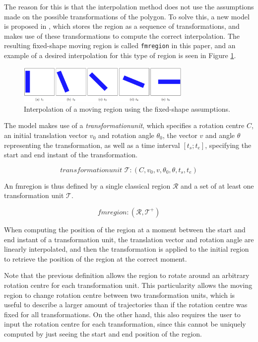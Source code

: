 The reason for this is that the interpolation method does not use the assumptions made on the possible transformations of the polygon. To solve this, a new model is proposed in \cite{fmregion}, which stores the region as a sequence of transformations, and makes use of these transformations to compute the correct interpolation. The resulting fixed-shape moving region is called \lstinline{fmregion} in this paper, and an example of a desired interpolation for this type of region is seen in Figure \ref{fig:fixed_shape_interpolation}.

\begin{figure}[h!]
    \centering
    \includegraphics[width=0.75\textwidth]{images/fixed_shape_interpolation.png}
    \caption[Linear interpolation of a fixed-shape moving region]{Interpolation of a moving region using the fixed-shape assumptions. \cite{fmregion}}
    \label{fig:fixed_shape_interpolation}
\end{figure}


The model makes use of a \textit{transformationunit}, which specifies a rotation centre $C$, an initial translation vector $v_0$ and rotation angle $\theta_0$, the vector $v$ and angle $\theta$ representing the transformation, as well as a time interval $[t_s; t_e]$, specifying the start and end instant of the transformation.

\[
    \textit{transformationunit } \mathcal{T}: (C, v_0, v, \theta_0, \theta, t_{s}, t_{e})
\]

An fmregion is thus defined by a single classical region $\mathcal{R}$ and a set of at least one transformation unit $\mathcal{T}$.

\[
    \textit{fmregion} : (\mathcal{R}, \mathcal{T}^{+})
\]

When computing the position of the region at a moment between the start and end instant of a transformation unit, the translation vector and rotation angle are linearly interpolated, and then the transformation is applied to the initial region to retrieve the position of the region at the correct moment.

Note that the previous definition allows the region to rotate around an arbitrary rotation centre for each transformation unit. This particularity allows the moving region to change rotation centre between two transformation units, which is useful to describe a larger amount of trajectories than if the rotation centre was fixed for all transformations. On the other hand, this also requires the user to input the rotation centre for each transformation, since this cannot be uniquely computed by just seeing the start and end position of the region.

